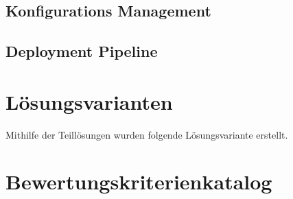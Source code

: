 \subsection{Konfigurations Management}
\subsection{Deployment Pipeline}

\section{Lösungsvarianten}

Mithilfe der Teillösungen wurden folgende Lösungsvariante erstellt. 

\section{Bewertungskriterienkatalog}

